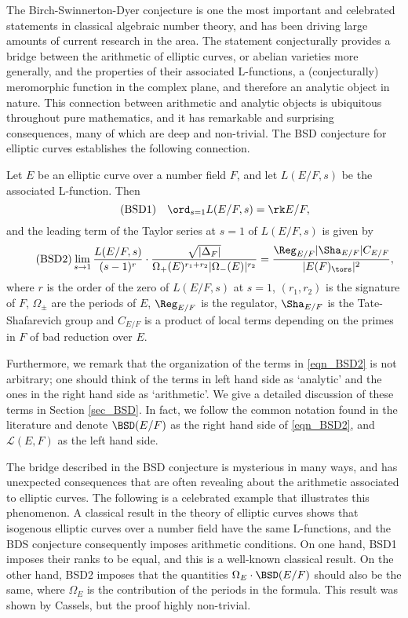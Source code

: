 The Birch-Swinnerton-Dyer conjecture is one the most important and celebrated statements in classical algebraic number theory, and has been driving large amounts of current research in the area. The statement conjecturally provides a bridge between the arithmetic of elliptic curves, or abelian varieties more generally, and the properties of their associated L-functions, a (conjecturally) meromorphic function in the complex plane, and therefore an analytic object in nature. This connection between arithmetic and analytic objects is ubiquitous throughout pure mathematics, and it has remarkable and surprising consequences, many of which are deep and non-trivial. The BSD conjecture for elliptic curves establishes the following connection.

\begin{conj}
    Let $E$ be an elliptic curve over a number field $F$, and let $L(E/F,s)$ be the associated L-function. Then
    \begin{equation}\label{eqn_BSD1}\tag{BSD1}
        \quad\ord_{s=1}L(E/F,s)=\rk E/F,
    \end{equation}
    and the leading term of the Taylor series at $s=1$ of $L(E/F,s)$ is given by
    \begin{equation}\label{eqn_BSD2}\tag{BSD2}
        \lim_{s\to1}\frac{L(E/F,s)}{(s-1)^r}\cdot\frac{\sqrt{|\Delta_F|}}{\Omega_+(E)^{r_1+r_2}|\Omega_-(E)|^{r_2}}=\frac{\Reg_{E/F}|\Sha_{E/F}|C_{E/F}}{|E(F)_{\tors}|^2},
    \end{equation}
    where $r$ is the order of the zero of $L(E/F,s)$ at $s=1$, $(r_1,r_2)$ is the signature of $F$, $\Omega_{\pm}$ are the periods of $E$, $\Reg_{E/F}$ is the regulator, $\Sha_{E/F}$ is the Tate-Shafarevich group and $C_{E/F}$ is a product of local terms depending on the primes in $F$ of bad reduction over $E$.
\end{conj}

Furthermore, we remark that the organization of the terms in \eqref{eqn_BSD2} is not arbitrary; one should think of the terms in left hand side as `analytic' and the ones in the right hand side as `arithmetic'. We give a detailed discussion of these terms in Section \ref{sec_BSD}. In fact, we follow the common notation found in the literature and denote $\BSD(E/F)$ as the right hand side of \eqref{eqn_BSD2}, and $\mathcal{L}(E,F)$ as the left hand side.

The bridge described in the BSD conjecture is mysterious in many ways, and has unexpected consequences that are often revealing about the arithmetic associated to elliptic curves. The following is a celebrated example that illustrates this phenomenon. A classical result in the theory of elliptic curves shows that isogenous elliptic curves over a number field have the same L-functions, and the BDS conjecture consequently imposes arithmetic conditions. On one hand, BSD1 imposes their ranks to be equal, and this is a well-known classical result. On the other hand, BSD2 imposes that the quantities $\Omega_E\cdot\BSD(E/F)$ should also be the same, where $\Omega_E$ is the contribution of the periods in the formula. This result was shown by Cassels, but the proof highly non-trivial. 

